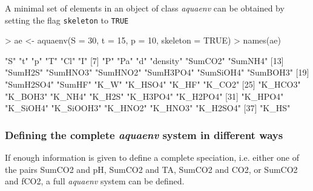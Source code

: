 \documentclass[article,nojss]{jss}
\begin{document}
A minimal set of elements in an object of class \textit{aquaenv} can be obtained by setting the flag \texttt{skeleton} to \texttt{TRUE}

\begin{Schunk}
\begin{Sinput}
> ae <- aquaenv(S = 30, t = 15, p = 10, skeleton = TRUE)
> names(ae)
\end{Sinput}
\begin{Soutput}
 [1] "S"        "t"        "p"        "T"        "Cl"       "I"       
 [7] "P"        "Pa"       "d"        "density"  "SumCO2"   "SumNH4"  
[13] "SumH2S"   "SumHNO3"  "SumHNO2"  "SumH3PO4" "SumSiOH4" "SumBOH3" 
[19] "SumH2SO4" "SumHF"    "K_W"      "K_HSO4"   "K_HF"     "K_CO2"   
[25] "K_HCO3"   "K_BOH3"   "K_NH4"    "K_H2S"    "K_H3PO4"  "K_H2PO4" 
[31] "K_HPO4"   "K_SiOH4"  "K_SiOOH3" "K_HNO2"   "K_HNO3"   "K_H2SO4" 
[37] "K_HS"    
\end{Soutput}
\end{Schunk}



\subsubsection{Defining the complete \textit{aquaenv} system in different ways}
If enough information is given to define a complete speciation, i.e. either one of the pairs
SumCO2 and pH, SumCO2 and TA, SumCO2 and CO2, or SumCO2 and fCO2, 
a full \textit{aquaenv} system can be defined.
\end{document}
